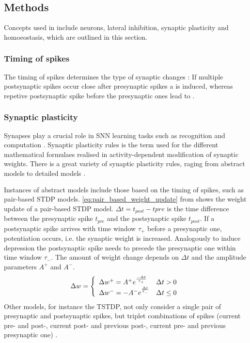 \subsection{Methods}
\label{subsec:methods}

Concepts used in \cite{SNN} include  neurons, lateral inhibition, synaptic plasticity and homoeostasis, which are outlined in this section.


\subsubsection{Timing of spikes}
The timing of spikes determines the type of synaptic changes \cite{LTP_D_bio}:
If multiple postsynaptic spikes occur close after presynaptic spikes a  is induced, 
whereas repetive postsynaptic spike before the presynaptic ones lead to .


\subsubsection{Synaptic plasticity}
Synapses play a crucial role in \ac{SNN} learning tasks such as recognition and computation \cite{Synaptic_plasticity}.
Synaptic plasticity rules is the term used for the different mathematical formulaes realised in activity-dependent modification of synaptic weights.
There is a great variety of synaptic plasticity rules, raging from abstract models to detailed models \cite{Synaptic_plasticity}.

Instances of abstract models include those based on the timing of spikes, such as pair-based \ac{STDP} models.
\autoref{eq:pair_based_weight_update} from \cite{Synaptic_plasticity} shows the weight update of a pair-based \ac{STDP} model.
$\Delta t = t_{post} - t{pre}$ is the time difference between the presynaptic spike $t_{pre}$ and the postsynaptic spike $t_{post}$.
If a postsynaptic spike arrives with time window $\tau_+$ before a presynaptic one, potentiation occurs, i.e. the synaptic weight is increased. 
Analogously to induce depression the postsynaptic spike needs to precede the presynaptic one within time window $\tau_-$.
The amount of weight change depends on $\Delta t $ and the amplitude parameters $A^+$ and $A^-$.
%
\begin{equation}
    \centering
    \label{eq:pair_based_weight_update}
    \Delta w = \left\{
        \begin{array}{ll}
        \Delta w^+ = A^+ e^{\frac{-\Delta t}{\tau_+}} & \Delta t > 0 \\
        \Delta w^- = -A^- e^{\frac{\Delta t}{\tau_-}} & \Delta t \le 0 \\
        \end{array}
        \right.
\end{equation}
%
Other models, for instance the \ac{TSTDP}, not only consider a single pair of presynaptic and postsynaptic spikes, 
but triplet combinations of spikes 
(current pre- and post-, current post- and previous post-, current pre- and previous presynaptic one) \cite{Synaptic_plasticity}.

